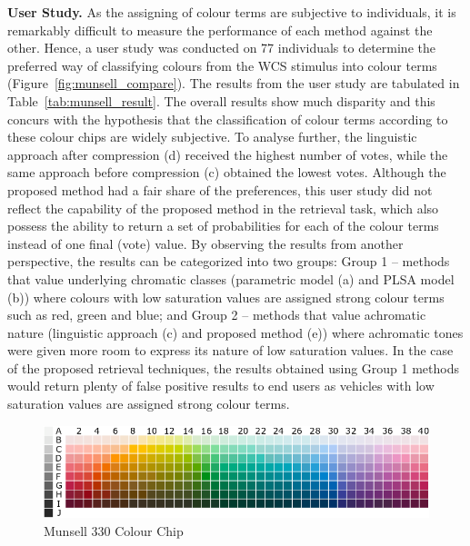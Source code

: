 \textbf{User Study.} As the assigning of colour terms are subjective to individuals, it is remarkably difficult to measure the performance of each method against the other. Hence, a user study was conducted on 77 individuals to determine the preferred way of classifying colours from the WCS stimulus into colour terms (Figure~\ref{fig:munsell_compare}). The results from the user study are tabulated in Table~\ref{tab:munsell_result}.
The overall results show much disparity and this concurs with the hypothesis that the classification of colour terms according to these colour chips are widely subjective.
To analyse further, the linguistic approach after compression (d) received the highest number of votes, while the same approach before compression (c) obtained the lowest votes.
Although the proposed method had a fair share of the preferences, this user study did not reflect the capability of the proposed method in the retrieval task, which also possess the ability to return a set of probabilities for each of the colour terms instead of one final (vote) value.
By observing the results from another perspective, the results can be categorized into two groups: Group 1 -- methods that value underlying chromatic classes (parametric model (a) and PLSA model (b)) where colours with low saturation values are assigned strong colour terms such as red, green and blue;
and Group 2 -- methods that value achromatic nature (linguistic approach (c) and proposed method (e)) where achromatic tones were given more room to express its nature of low saturation values.
In the case of the proposed retrieval techniques, the results obtained using Group 1 methods would return plenty of false positive results to end users as vehicles with low saturation values are assigned strong colour terms.

\begin{figure}[hbt!]\centering
\includegraphics[width=.9\textwidth]{image/analysis/munsell_o.png}
\caption{Munsell 330 Colour Chip}
\label{fig:munsell_ori330}
\end{figure}

